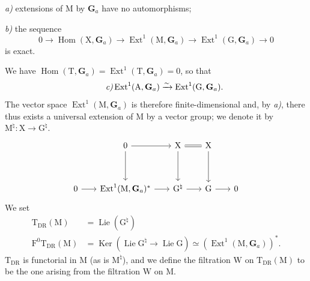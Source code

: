\documentclass[11pt,leqno]{article}
\begin{document}
\noindent \textit{a)} extensions of \(\mathrm{M}\) by
\(\mathbf{G}_a\) have no automorphisms;\par
\noindent \textit{b)} the sequence
\[
0\to\operatorname{Hom}(\mathrm{X},\mathbf{G}_a)
\to\operatorname{Ext}^1(\mathrm{M},\mathbf{G}_a)
\to\operatorname{Ext}^1(\mathrm{G},\mathbf{G}_a)\to0
\]
is exact.

We have
\(\operatorname{Hom}(\mathrm{T},\mathbf{G}_a)
=\operatorname{Ext}^1(\mathrm{T},\mathbf{G}_a)=0\), so that
\[
\tag*{\textit{c)}}
\operatorname{Ext}^1(\mathrm{A},\mathbf{G}_a)
\xrightarrow{\sim}
\operatorname{Ext}^1(\mathrm{G},\mathbf{G}_a).
\]
The vector space \(\operatorname{Ext}^1(\mathrm{M},\mathbf{G}_a)\)
is therefore finite-dimensional and, by \textit{a)}, there thus exists a
universal extension of \(\mathrm{M}\) by a vector group;
we denote it by \(\mathrm{M}^{\natural}:\mathrm{X}\to\mathrm{G}^{\natural}\).
\[
\begin{tikzcd}[column sep=1.8em, row sep=3.5em]
&
0 \arrow[r] \arrow[d]
&
\mathrm{X} \arrow[r, equal] \arrow[d]
&
\mathrm{X} \arrow[d]
&
\\
0 \arrow[r]
&
\operatorname{Ext}^1(\mathrm{M},\mathbf{G}_a)^* \arrow[r]
&
\mathrm{G}^{\natural} \arrow[r]
&
\mathrm{G} \arrow[r]
&
0
\end{tikzcd}
\]
We set
\[
\begin{aligned}
\mathrm{T}_{\mathrm{DR}}(\mathrm{M})
  &=\operatorname{Lie}(\mathrm{G}^{\natural})
\\
\mathrm{F}^0\mathrm{T}_{\mathrm{DR}}(\mathrm{M})
  &=\operatorname{Ker}
    (\operatorname{Lie}\mathrm{G}^{\natural}\to\operatorname{Lie}\mathrm{G})
    \simeq(\operatorname{Ext}^1(\mathrm{M},\mathbf{G}_a))^*.
\end{aligned}
\]
\(\mathrm{T}_{\mathrm{DR}}\) is functorial in \(\mathrm{M}\)
(as is \(\mathrm{M}^{\natural}\)), and we define the filtration
\(\mathrm{W}\) on \(\mathrm{T}_{\mathrm{DR}}(\mathrm{M})\) to be the one
arising from the filtration \(\mathrm{W}\) on \(\mathrm{M}\).
\end{document}

